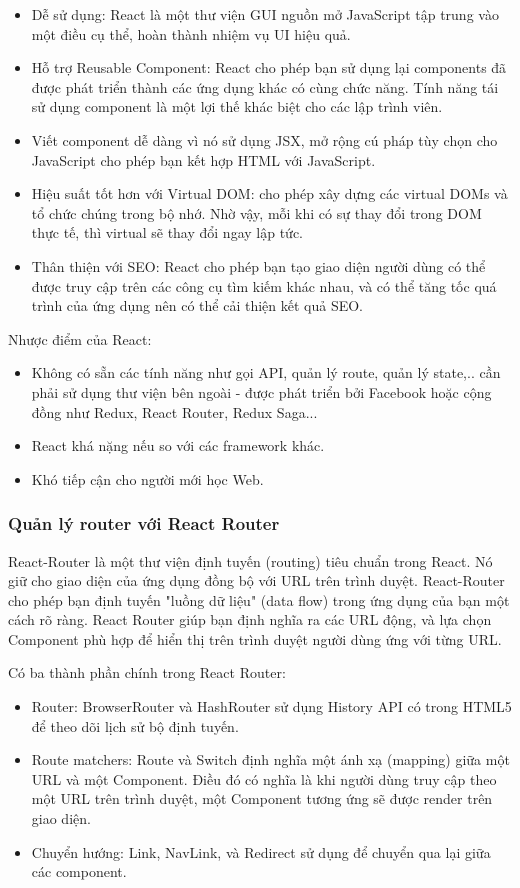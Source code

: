 \begin{itemize}
    \item Dễ sử dụng: React là một thư viện GUI nguồn mở JavaScript tập trung vào một điều cụ thể, hoàn thành nhiệm vụ UI hiệu quả.
    \item Hỗ trợ Reusable Component: React cho phép bạn sử dụng lại components đã được phát triển thành các ứng dụng khác có cùng chức năng. Tính năng tái sử dụng component là một lợi thế khác biệt cho các lập trình viên.
    \item Viết component dễ dàng vì nó sử dụng JSX, mở rộng cú pháp tùy chọn cho JavaScript cho phép bạn kết hợp HTML với JavaScript.
    \item Hiệu suất tốt hơn với Virtual DOM: cho phép xây dựng các virtual DOMs và tổ chức chúng trong bộ nhớ. Nhờ vậy, mỗi khi có sự thay đổi trong DOM thực tế, thì virtual sẽ thay đổi ngay lập tức.
    \item Thân thiện với SEO: React cho phép bạn tạo giao diện người dùng có thể được truy cập trên các công cụ tìm kiếm khác nhau, và có thể tăng tốc quá trình của ứng dụng nên có thể cải thiện kết quả SEO.
\end{itemize}
Nhược điểm của React:
\begin{itemize}
    \item Không có sẵn các tính năng như gọi API, quản lý route, quản lý state,.. cần phải sử dụng thư viện bên ngoài - được phát triển bởi Facebook hoặc
cộng đồng như Redux, React Router, Redux Saga...
    \item React khá nặng nếu so với các framework khác.
    \item Khó tiếp cận cho người mới học Web.
\end{itemize}

\subsubsection{Quản lý router với React Router}
React-Router là một thư viện định tuyến (routing) tiêu chuẩn trong React. Nó giữ cho giao diện của ứng dụng đồng bộ với URL trên trình duyệt. React-Router cho phép bạn định tuyến "luồng dữ liệu" (data flow) trong ứng dụng của bạn một cách rõ ràng. React Router giúp bạn định nghĩa ra các URL động, và lựa chọn Component phù hợp để hiển thị trên trình duyệt người dùng ứng với từng URL.\par
Có ba thành phần chính trong React Router:
\begin{itemize}
    \item Router: BrowserRouter và HashRouter sử dụng History API có trong HTML5 để theo dõi lịch sử bộ định tuyến.
    \item Route matchers: Route và Switch định nghĩa một ánh xạ (mapping) giữa một URL và một Component. Điều đó có nghĩa là khi người dùng truy cập theo một URL trên trình duyệt, một Component tương ứng sẽ được render trên giao diện.
    \item Chuyển hướng: Link, NavLink, và Redirect sử dụng để chuyển qua lại giữa các component.
\end{itemize}

